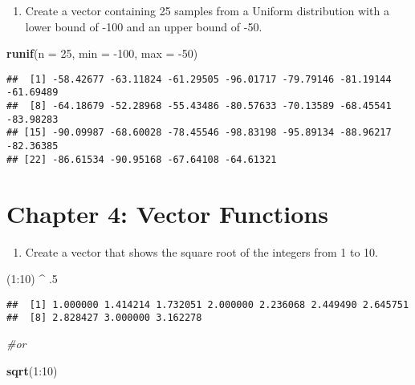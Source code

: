 \documentclass[]{book}
\newenvironment{Shaded}{\begin{snugshade}}{\end{snugshade}}
\newcommand{\KeywordTok}[1]{\textcolor[rgb]{0.13,0.29,0.53}{\textbf{{#1}}}}
\newcommand{\DataTypeTok}[1]{\textcolor[rgb]{0.13,0.29,0.53}{{#1}}}
\newcommand{\DecValTok}[1]{\textcolor[rgb]{0.00,0.00,0.81}{{#1}}}
\newcommand{\StringTok}[1]{\textcolor[rgb]{0.31,0.60,0.02}{{#1}}}
\newcommand{\CommentTok}[1]{\textcolor[rgb]{0.56,0.35,0.01}{\textit{{#1}}}}
\newcommand{\NormalTok}[1]{{#1}}
\providecommand{\tightlist}{%
  \setlength{\itemsep}{0pt}\setlength{\parskip}{0pt}}
\begin{document}
\begin{enumerate}
\def\labelenumi{\arabic{enumi}.}
\setcounter{enumi}{8}
\tightlist
\item
  Create a vector containing 25 samples from a Uniform distribution with
  a lower bound of -100 and an upper bound of -50.
\end{enumerate}

\begin{Shaded}
\begin{Highlighting}[]
\KeywordTok{runif}\NormalTok{(}\DataTypeTok{n =} \DecValTok{25}\NormalTok{, }\DataTypeTok{min =} \NormalTok{-}\DecValTok{100}\NormalTok{, }\DataTypeTok{max =} \NormalTok{-}\DecValTok{50}\NormalTok{)}
\end{Highlighting}
\end{Shaded}

\begin{verbatim}
##  [1] -58.42677 -63.11824 -61.29505 -96.01717 -79.79146 -81.19144 -61.69489
##  [8] -64.18679 -52.28968 -55.43486 -80.57633 -70.13589 -68.45541 -83.98283
## [15] -90.09987 -68.60028 -78.45546 -98.83198 -95.89134 -88.96217 -82.36385
## [22] -86.61534 -90.95168 -67.64108 -64.61321
\end{verbatim}

\section{Chapter 4: Vector Functions}\label{chapter-4-vector-functions}

\begin{enumerate}
\def\labelenumi{\arabic{enumi}.}
\tightlist
\item
  Create a vector that shows the square root of the integers from 1 to
  10.
\end{enumerate}

\begin{Shaded}
\begin{Highlighting}[]
\NormalTok{(}\DecValTok{1}\NormalTok{:}\DecValTok{10}\NormalTok{) ^}\StringTok{ }\NormalTok{.}\DecValTok{5}
\end{Highlighting}
\end{Shaded}

\begin{verbatim}
##  [1] 1.000000 1.414214 1.732051 2.000000 2.236068 2.449490 2.645751
##  [8] 2.828427 3.000000 3.162278
\end{verbatim}

\begin{Shaded}
\begin{Highlighting}[]
\CommentTok{#or}

\KeywordTok{sqrt}\NormalTok{(}\DecValTok{1}\NormalTok{:}\DecValTok{10}\NormalTok{)}
\end{Highlighting}
\end{Shaded}
\end{document}
